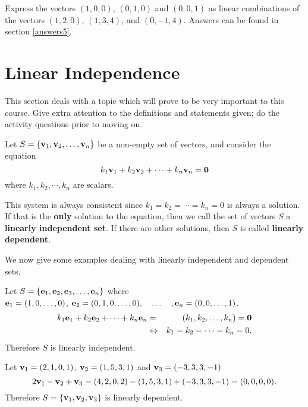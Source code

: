 
Express the vectors $(1,0,0)$, $(0,1,0)$ and $(0,0,1)$ as linear
combinations of the vectors $(1,2,0)$, $(1,3,4)$, and $(0,-1,4)$.
Answers can be found in section \ref{answers5}.

\section{Linear Independence}
\label{ssec.li}  This
section deals with a topic which will prove to be very important
to this course. Give extra attention to the definitions and
statements given; do the activity questions prior to moving on.

Let $S=\{{\bf v}_1,{\bf v}_2, \ldots, {\bf v}_n\}$ be a non-empty
set of vectors, and consider the equation $$k_1{\bf v}_1+k_2{\bf
v}_2+\cdots+k_n{\bf v}_n={\bf 0}$$ where $k_1,k_2,\cdots,k_n$ are
scalars.

This system is always consistent since $k_1=k_2=\cdots=k_n=0$ is
always a solution. If that is the {\bf only} solution to the
equation, then we call the set of vectors $S$ a {\bf linearly
independent set}.  If there are other solutions, then $S$ is
called {\bf linearly dependent}.

\noindent We now give some examples dealing with linearly
independent and dependent sets.

\begin{example}
\label{exam5.standardRn} Let $S=\{ {\bf e}_1, {\bf e}_2, {\bf
e}_3, \ldots ,{\bf e}_n \}$ where \\ ${\bf e}_1=(1,0,\ldots, 0)$,
${\bf e}_2=(0,1,0,\ldots,0), \quad \ldots \quad, {\bf
e}_n=(0,0,\ldots,1)$.
\begin{eqnarray*}
k_1{\bf e}_1+k_2{\bf e}_2+\cdots+k_n{\bf
e}_n&=&(k_1,k_2,\ldots,k_n)={\bf 0}\\ &\Leftrightarrow&
k_1=k_2=\cdots=k_n=0. \end{eqnarray*} Therefore $S$ is linearly
independent.
\end{example}

\begin{example}
\label{exam5.ld}
 Let ${\bf v}_1=(2,1,0,1)$, ${\bf v}_2=(1,5,3,1)$
and ${\bf v}_3=(-3,3,3,-1)$ $$2{\bf v}_1-{\bf v}_2+{\bf
v}_3=(4,2,0,2)-(1,5,3,1)+(-3,3,3,-1)=(0,0,0,0).$$ Therefore
$S=\{{\bf v}_1,{\bf v}_2,{\bf v}_3\}$ is linearly dependent.
\end{example}

